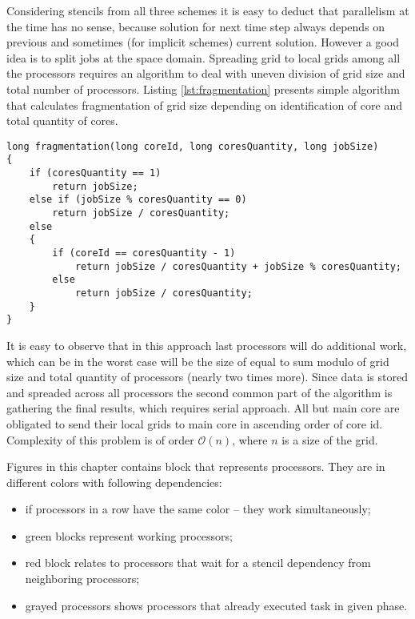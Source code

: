 	Considering \gls{stencil}s from all three schemes it is easy to deduct that parallelism at the time has no sense, because solution for next time step always depends on previous and sometimes (for implicit schemes) current solution. However a good idea is to split jobs at the space domain. Spreading grid to local grids among all the processors requires an algorithm to deal with uneven division of grid size and total number of processors. Listing \ref{lst:fragmentation} presents simple algorithm that calculates fragmentation of grid size depending on identification of core and total quantity of cores.
	\begin{lstlisting}[caption=Grid fragmentation algorithm written in C++., label=lst:fragmentation] 
long fragmentation(long coreId, long coresQuantity, long jobSize)
{
	if (coresQuantity == 1)
		return jobSize;
	else if (jobSize % coresQuantity == 0)
		return jobSize / coresQuantity;
	else
	{
		if (coreId == coresQuantity - 1)
			return jobSize / coresQuantity + jobSize % coresQuantity;
		else
			return jobSize / coresQuantity;
	}
}
	\end{lstlisting} 
	It is easy to observe that in this approach last processors will do additional work, which can be in the worst case will be the size of equal to sum modulo of grid size and total quantity of processors (nearly two times more). Since data is stored and spreaded across all processors the second common part of the algorithm is gathering the final results, which requires serial approach. All but main core are obligated to send their local grids to main core in ascending order of core id. Complexity of this problem is of order $\mathcal{O}(n)$, where $n$ is a size of the grid.
	
	Figures in this chapter contains block that represents processors. They are in different colors with following dependencies:
	\begin{itemize}
		\item if processors in a row have the same color -- they work simultaneously;
		\item green blocks represent working processors;
		\item red block relates to processors that wait for a \gls{stencil} dependency from neighboring processors;
		\item grayed processors shows processors that already executed task in given phase.
	\end{itemize}
	\clearpage
	
	\clearpage
	
	\clearpage
	
	\clearpage